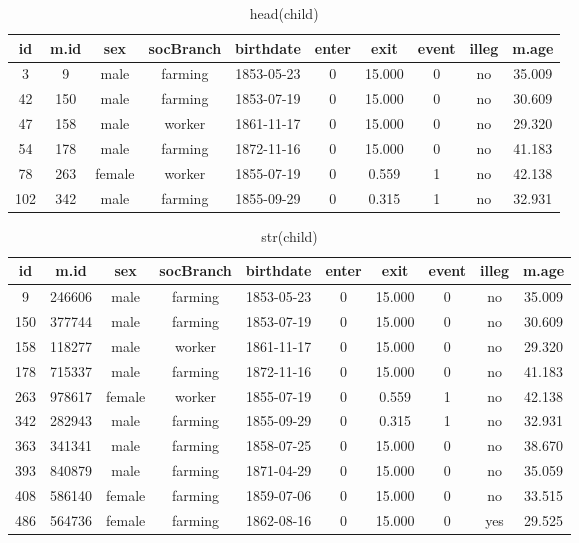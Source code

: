 \documentclass[12pt,letterpaper]{article}
\begin{document}

\begin{table}[htbp]
    \centering
    \caption{head(child)}
    \label{tab:your_table_label}
    \begin{tabular}{cccccccccc} %
        \hline
        id & m.id & sex & socBranch & birthdate & enter & exit & event & illeg & m.age \\
        \hline
        3 & 9 & male & farming & 1853-05-23 & 0 & 15.000 & 0 & no & 35.009 \\
        42 & 150 & male & farming & 1853-07-19 & 0 & 15.000 & 0 & no & 30.609 \\
        47 & 158 & male & worker & 1861-11-17 & 0 & 15.000 & 0 & no & 29.320 \\
        54 & 178 & male & farming & 1872-11-16 & 0 & 15.000 & 0 & no & 41.183 \\
        78 & 263 & female & worker & 1855-07-19 & 0 & 0.559 & 1 & no & 42.138 \\
        102 & 342 & male & farming & 1855-09-29 & 0 & 0.315 & 1 & no & 32.931 \\
        \hline
    \end{tabular}
\end{table}

\begin{table}[htbp]
    \centering
    \caption{str(child)} 
    \label{tab:your_table_label}
    \begin{tabular}{cccccccccc} 
        \hline
        id & m.id & sex & socBranch & birthdate & enter & exit & event & illeg & m.age \\
        \hline
        9 & 246606 & male & farming & 1853-05-23 & 0 & 15.000 & 0 & no & 35.009 \\
        150 & 377744 & male & farming & 1853-07-19 & 0 & 15.000 & 0 & no & 30.609 \\
        158 & 118277 & male & worker & 1861-11-17 & 0 & 15.000 & 0 & no & 29.320 \\
        178 & 715337 & male & farming & 1872-11-16 & 0 & 15.000 & 0 & no & 41.183 \\
        263 & 978617 & female & worker & 1855-07-19 & 0 & 0.559 & 1 & no & 42.138 \\
        342 & 282943 & male & farming & 1855-09-29 & 0 & 0.315 & 1 & no & 32.931 \\
        363 & 341341 & male & farming & 1858-07-25 & 0 & 15.000 & 0 & no & 38.670 \\
        393 & 840879 & male & farming & 1871-04-29 & 0 & 15.000 & 0 & no & 35.059 \\
        408 & 586140 & female & farming & 1859-07-06 & 0 & 15.000 & 0 & no & 33.515 \\
        486 & 564736 & female & farming & 1862-08-16 & 0 & 15.000 & 0 & yes & 29.525 \\
        \hline
    \end{tabular}
\end{table}
\end{document}
